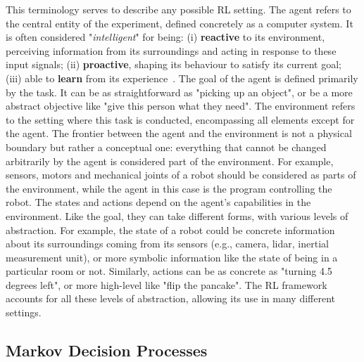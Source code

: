 This terminology serves to describe any possible RL setting. The agent refers to the central entity of the experiment, defined concretely as a computer system. It is often considered "\textit{intelligent}" for being: (i) \textbf{reactive} to its environment, perceiving information from its surroundings and acting in response to these input signals; (ii) \textbf{proactive}, shaping its behaviour to satisfy its current goal; (iii) able to \textbf{learn} from its experience~\citep{Wooldridge1995_IntelligentAgents}. The goal of the agent is defined primarily by the task. It can be as straightforward as "picking up an object", or be a more abstract objective like "give this person what they need". The environment refers to the setting where this task is conducted, encompassing all elements except for the agent. The frontier between the agent and the environment is not a physical boundary but rather a conceptual one: everything that cannot be changed arbitrarily by the agent is considered part of the environment. For example, sensors, motors and mechanical joints of a robot should be considered as parts of the environment, while the agent in this case is the program controlling the robot. The states and actions depend on the agent's capabilities in the environment. Like the goal, they can take different forms, with various levels of abstraction. For example, the state of a robot could be concrete information about its surroundings coming from its sensors (e.g., camera, lidar, inertial measurement unit), or more symbolic information like the state of being in a particular room or not. Similarly, actions can be as concrete as "turning 4.5 degrees left", or more high-level like "flip the pancake". The RL framework accounts for all these levels of abstraction, allowing its use in many different settings. 




\subsection{Markov Decision Processes}\label{sec:RL:MDPs}

